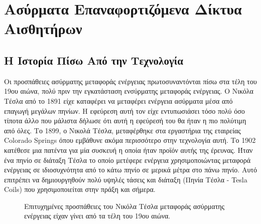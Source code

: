 

\chapter{Ασύρματα Επαναφορτιζόμενα Δίκτυα Αισθητήρων}\label{ch:wrsns}
\section{Η Ιστορία Πίσω Από την Τεχνολογία}
Οι προσπάθειες ασύρματης μεταφοράς ενέργειας πρωτοσυναντόνται πίσω στα τέλη του 19ου αιώνα, πολύ πριν την εγκατάσταση ενσύρματης μεταφοράς ενέργειας. Ο Νικόλα Τέσλα
από το 1891 είχε καταφέρει να μεταφέρει ενέργεια ασύρματα μέσα από επαγωγή μεγάλων πηνίων. Η εφεύρεση αυτή τον είχε εντυπωσιάσει τόσο πολύ όσο τίποτα άλλο που
μάλιστα δήλωσε ότι αυτή η εφεύρεσή του θα ήταν η πιο πολύτιμη από όλες. Tο 1899, ο Νικολά Τέσλα, μεταφέρθηκε στα εργαστήρια της εταιρείας Colorado Springs όπου
εμβάθυνε ακόμα περισσότερο στην τεχνολογία αυτή. Το 1902 κατέθεσε μια πατέντα \cite{tesla_patent} για μία συσκευή η οποία ήταν προϊόν αυτής της έρευνας. Ήταν ένα
πηνίο σε διάταξη Τέσλα το οποίο μετέφερε ενέργεια χρησιμοποιώντας μεταφορά ενέργειας σε ιδιοσυχνότητα από το κάτω πηνίο σε μερικά μέτρα στο πάνω πηνίο. Αυτό
επιτρέπει να δημιουργηθούν πολύ υψηλές τάσεις και διάταξη (Πηνία Τέσλα - Tesla Coils) που χρησιμοποιείται στην πράξη και σήμερα.

\begin{figure}[h]
  \centering
  \caption{Επιτυχημένες προσπάθειες του Νικόλα Τέσλα μεταφοράς ασύρματης ενέργειας είχαν γίνει από τα τέλη του 19ου αιώνα.}
  \label{fig:tesla_eperiments}
\end{figure}

